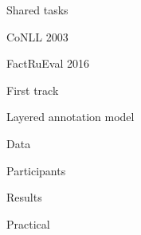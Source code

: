 \documentclass[10pt, compress]{beamer}
\begin{document}
\begin{frame}[standout]
Shared tasks
\end{frame}

\begin{frame}{CoNLL 2003}


\end{frame}

\begin{frame}{FactRuEval 2016}


\end{frame}

\begin{frame}{First track}

\end{frame}


\begin{frame}{Layered annotation model}


\end{frame}

\begin{frame}{Data}

\end{frame}

\begin{frame}{Participants}

\end{frame}

\begin{frame}{Results}

\end{frame}

\begin{frame}[standout]
Practical
\end{frame}
\end{document}
